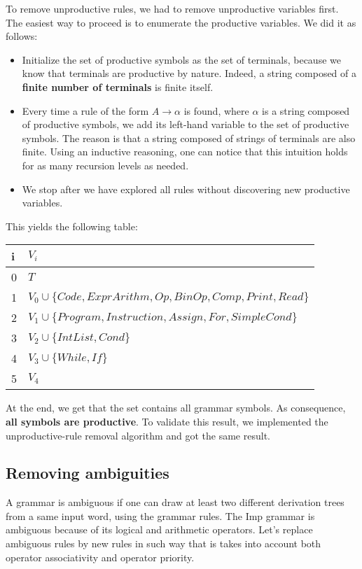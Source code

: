 To remove unproductive rules, we had to remove unproductive variables first. The easiest way to proceed is to enumerate the productive variables.
We did it as follows:
\begin{itemize}
  \item Initialize the set of productive symbols as the set of terminals, because we know that terminals are productive by nature. Indeed, 
  a string composed of a \textbf{finite number of terminals} is finite itself.
  \item Every time a rule of the form $A \rightarrow \alpha$ is found, where $\alpha$ is a string composed of productive symbols, we add its left-hand 
  variable to the set of productive symbols. The reason is that a string composed of strings of terminals are also finite. Using an inductive reasoning, 
  one can notice that this intuition holds for as many recursion levels as needed.
  \item We stop after we have explored all rules without discovering new productive variables.
\end{itemize}
This yields the following table:

\begin{tabular}{|l p{35em}|} \hline
   i & $V_i$ \\ \hline
  0 & $T$ \\ \hline
  1 & $V_0 \cup \{Code, ExprArithm, Op, BinOp, Comp, Print, Read\}$ \\ \hline
  2 & $V_1 \cup \{Program, Instruction, Assign, For, SimpleCond\}$ \\ \hline
  3 & $V_2 \cup \{IntList, Cond\}$ \\ \hline
  4 & $V_3 \cup \{While, If\}$ \\ \hline
  5 & $V_4$ \\ \hline
\end{tabular}

At the end, we get that the set contains all grammar symbols. As consequence, \textbf{all symbols are productive}. To validate this result, we implemented
the unproductive-rule removal algorithm and got the same result.

\subsection{Removing ambiguities}

A grammar is ambiguous if one can draw at least two different derivation trees from a same input word, using the grammar rules.
The Imp grammar is ambiguous because of its logical and arithmetic operators. Let's replace ambiguous rules by new rules in such way
that is takes into account both operator associativity and operator priority.


